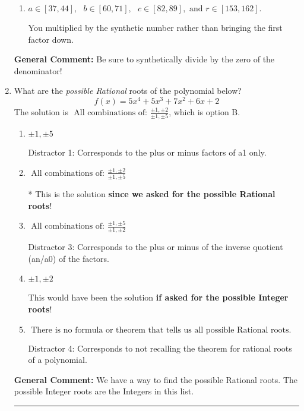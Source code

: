 \documentclass{extbook}[14pt]
\newcommand{\litem}[1]{\item #1

\rule{\textwidth}{0.4pt}}
\begin{document}
\begin{enumerate}
{\begin{enumerate}[label=\Alph*.]
 You divided by the opposite of the factor AND multiplied the first factor rather than just bringing it down.
\item \( a \in [37, 44], \text{   } b \in [60, 71], \text{   } c \in [82, 89], \text{   and   } r \in [153, 162]. \)

 You multiplied by the synthetic number rather than bringing the first factor down.
\end{enumerate}

\textbf{General Comment:} Be sure to synthetically divide by the zero of the denominator!
}
\litem{
What are the \textit{possible Rational} roots of the polynomial below?
\[ f(x) = 5x^{4} +5 x^{3} +7 x^{2} +6 x + 2 \]The solution is \( \text{ All combinations of: }\frac{\pm 1,\pm 2}{\pm 1,\pm 5} \), which is option B.\begin{enumerate}[label=\Alph*.]
\item \( \pm 1,\pm 5 \)

 Distractor 1: Corresponds to the plus or minus factors of a1 only.
\item \( \text{ All combinations of: }\frac{\pm 1,\pm 2}{\pm 1,\pm 5} \)

* This is the solution \textbf{since we asked for the possible Rational roots}!
\item \( \text{ All combinations of: }\frac{\pm 1,\pm 5}{\pm 1,\pm 2} \)

 Distractor 3: Corresponds to the plus or minus of the inverse quotient (an/a0) of the factors. 
\item \( \pm 1,\pm 2 \)

This would have been the solution \textbf{if asked for the possible Integer roots}!
\item \( \text{ There is no formula or theorem that tells us all possible Rational roots.} \)

 Distractor 4: Corresponds to not recalling the theorem for rational roots of a polynomial.
\end{enumerate}

\textbf{General Comment:} We have a way to find the possible Rational roots. The possible Integer roots are the Integers in this list.
}
\end{enumerate}
\end{document}
